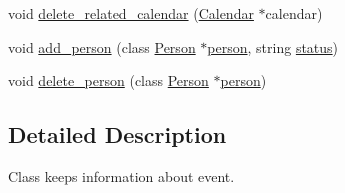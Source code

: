 \begin{DoxyCompactItemize}
void \hyperlink{classEvent_ac4bc91dab8ca340c58aed7c91a8376a7}{delete\_\-related\_\-calendar} (\hyperlink{classCalendar}{Calendar} $\ast$calendar)
\item 
void \hyperlink{classEvent_a77077d8d27027113b2e20b4374a00a61}{add\_\-person} (class \hyperlink{classPerson}{Person} $\ast$\hyperlink{group__content_8h_ab8664e6fd42f01eeaad084b5e20eb54e}{person}, string \hyperlink{group__content_8h_ab4d38e7365d935f2a5f1403eec29127e}{status})
\item 
void \hyperlink{classEvent_a5e071ee79b9ac9520fa5f26d763ce662}{delete\_\-person} (class \hyperlink{classPerson}{Person} $\ast$\hyperlink{group__content_8h_ab8664e6fd42f01eeaad084b5e20eb54e}{person})
\end{DoxyCompactItemize}


\subsection{Detailed Description}
Class keeps information about event. 

